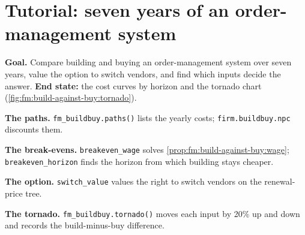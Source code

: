\section{Tutorial: seven years of an order-management system}\label{tut:fm:build-against-buy:tut}

\begin{tutorial}
\textbf{Goal.} Compare building and buying an order-management system over seven years, value the option to switch vendors, and find which inputs
decide the answer. \textbf{End state:} the cost curves by horizon and the tornado chart (\cref{fig:fm:build-against-buy:tornado}).
\begin{tutsteps}
\item \textbf{The paths.} \texttt{fm\_buildbuy.paths()} lists the yearly costs; \texttt{firm.buildbuy.npc} discounts them.
\item \textbf{The break-evens.} \texttt{breakeven\_wage} solves \cref{prop:fm:build-against-buy:wage}; \texttt{breakeven\_horizon} finds the horizon from
which building stays cheaper.
\item \textbf{The option.} \texttt{switch\_value} values the right to switch vendors on the renewal-price tree.
\item \textbf{The tornado.} \texttt{fm\_buildbuy.tornado()} moves each input by 20\% up and down and records the build-minus-buy difference.
\end{tutsteps}
\end{tutorial}

